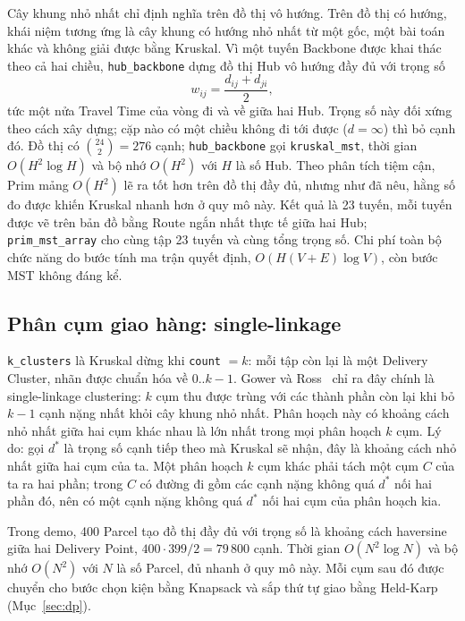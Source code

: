 Cây khung nhỏ nhất chỉ định nghĩa trên đồ thị vô hướng. Trên đồ thị có hướng, khái niệm tương ứng là cây khung có hướng nhỏ nhất từ một gốc, một bài toán khác và không giải được bằng Kruskal. Vì một tuyến Backbone được khai thác theo cả hai chiều, \texttt{hub\_backbone} dựng đồ thị Hub vô hướng đầy đủ với trọng số
\[
w_{ij} = \frac{d_{ij} + d_{ji}}{2},
\]
tức một nửa Travel Time của vòng đi và về giữa hai Hub. Trọng số này đối xứng theo cách xây dựng; cặp nào có một chiều không đi tới được ($d = \infty$) thì bỏ cạnh đó. Đồ thị có $\binom{24}{2} = 276$ cạnh; \texttt{hub\_backbone} gọi \texttt{kruskal\_mst}, thời gian $O(H^2\log H)$ và bộ nhớ $O(H^2)$ với $H$ là số Hub. Theo phân tích tiệm cận, Prim mảng $O(H^2)$ lẽ ra tốt hơn trên đồ thị đầy đủ, nhưng như đã nêu, hằng số đo được khiến Kruskal nhanh hơn ở quy mô này. Kết quả là 23 tuyến, mỗi tuyến được vẽ trên bản đồ bằng Route ngắn nhất thực tế giữa hai Hub; \texttt{prim\_mst\_array} cho cùng tập 23 tuyến và cùng tổng trọng số. Chi phí toàn bộ chức năng do bước tính ma trận quyết định, $O(H(V+E)\log V)$, còn bước MST không đáng kể.

\subsection{Phân cụm giao hàng: single-linkage}

\texttt{k\_clusters} là Kruskal dừng khi \texttt{count} $= k$: mỗi tập còn lại là một Delivery Cluster, nhãn được chuẩn hóa về $0..k-1$. Gower và Ross~\cite{gower1969} chỉ ra đây chính là single-linkage clustering: $k$ cụm thu được trùng với các thành phần còn lại khi bỏ $k-1$ cạnh nặng nhất khỏi cây khung nhỏ nhất. Phân hoạch này có khoảng cách nhỏ nhất giữa hai cụm khác nhau là lớn nhất trong mọi phân hoạch $k$ cụm. Lý do: gọi $d^*$ là trọng số cạnh tiếp theo mà Kruskal sẽ nhận, đây là khoảng cách nhỏ nhất giữa hai cụm của ta. Một phân hoạch $k$ cụm khác phải tách một cụm $C$ của ta ra hai phần; trong $C$ có đường đi gồm các cạnh nặng không quá $d^*$ nối hai phần đó, nên có một cạnh nặng không quá $d^*$ nối hai cụm của phân hoạch kia.

Trong demo, 400 Parcel tạo đồ thị đầy đủ với trọng số là khoảng cách haversine giữa hai Delivery Point, $400 \cdot 399/2 = 79\,800$ cạnh. Thời gian $O(N^2\log N)$ và bộ nhớ $O(N^2)$ với $N$ là số Parcel, đủ nhanh ở quy mô này. Mỗi cụm sau đó được chuyển cho bước chọn kiện bằng Knapsack và sắp thứ tự giao bằng Held-Karp (Mục~\ref{sec:dp}).

